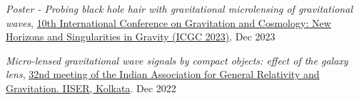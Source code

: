 \begin{itemize}[noitemsep]
{
\item \textit{Poster - Probing black hole hair with gravitational microlensing of gravitational waves}, \href{https://indico.cern.ch/event/1268737/registrations/participants}{10th International Conference on Gravitation and Cosmology: New Horizons and Singularities in Gravity (ICGC 2023)}. \hfill{Dec 2023}
\item \textit{Micro-lensed gravitational wave signals by compact objects: effect of the galaxy lens}, \href{https://www.iiserkol.ac.in/~iagrg32/}{32nd meeting of the Indian Association for General Relativity and Gravitation. IISER, Kolkata}. \hfill{Dec 2022}

}\end{itemize}

